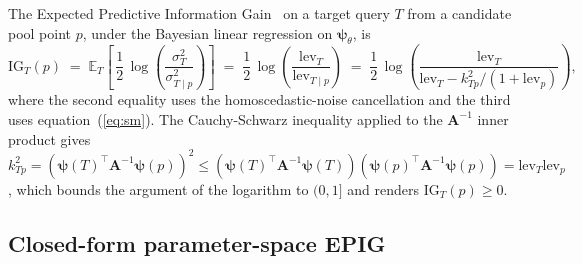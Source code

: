 \documentclass[11pt,a4paper]{article}
\newcommand{\Ainv}{\bm{A}^{-1}}
\newcommand{\psib}{\bm{\psi}}
\begin{document}
The Expected Predictive Information Gain~\cite{Smith:2023epig} on a target query $T$ from a candidate pool point $p$, under the Bayesian linear regression on $\psib_\theta$, is
\begin{equation}
  \mathrm{IG}_T(p) \;=\; \mathbb{E}_{T}\!\left[\,\frac{1}{2}\,\log\!\left(\frac{\sigma_T^2}{\sigma_{T \mid p}^2}\right)\right]
  \;=\; \frac{1}{2}\,\log\!\left(\frac{\mathrm{lev}_T}{\mathrm{lev}_{T \mid p}}\right)
  \;=\; \frac{1}{2}\,\log\!\left(\frac{\mathrm{lev}_T}{\mathrm{lev}_T - k_{Tp}^2 / (1 + \mathrm{lev}_p)}\right),
\end{equation}
where the second equality uses the homoscedastic-noise cancellation and the third uses equation~(\ref{eq:sm}). The Cauchy-Schwarz inequality applied to the $\Ainv$ inner product gives $k_{Tp}^2 = (\psib(T)^\top \Ainv \psib(p))^2 \leq (\psib(T)^\top \Ainv \psib(T)) (\psib(p)^\top \Ainv \psib(p)) = \mathrm{lev}_T \mathrm{lev}_p$, which bounds the argument of the logarithm to $(0, 1]$ and renders $\mathrm{IG}_T(p) \geq 0$.

\subsection{Closed-form parameter-space EPIG}
\end{document}
